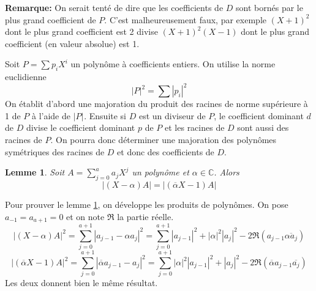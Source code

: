 \documentclass[a4paper,11pt]{book}
\newtheorem{lemma}[thm]{Lemme}
\begin{document}
\begin{giacjshere}
{\bf{Remarque:}} On serait tenté de dire que les coefficients de $D$
sont bornés par le plus grand coefficient de $P$. C'est malheureusement faux,
par exemple $( X + 1 )^2$ dont le plus grand coefficient est 2 divise $( X + 1
)^2 ( X - 1 )$ dont le plus grand coefficient (en valeur absolue) est 1.

Soit $P = \sum p_i X^i$ un polynôme à coefficients entiers. On utilise la
norme euclidienne
\begin{equation}
  | P |^2 = \sum | p_i |^2
\end{equation}
On établit d'abord une majoration du produit des racines de norme supérieure à
1 de $P$ à l'aide de $| P |^{}$. Ensuite si $D$ est un diviseur de $P$, le
coefficient dominant $d$ de $D$ divise le coefficient dominant $p$ de $P$ et 
les racines de $D$ sont aussi des racines de $P$. On pourra donc déterminer une
majoration des polynômes symétriques des racines de $D$ et donc des
coefficients de $D$.

\begin{lemma} \label{lemme:A}
  Soit $A = \sum_{j = 0}^a a_j X^j$ un polynôme et $\alpha \in \mathbb{C}$.
  Alors
  \[ | ( X - \alpha ) A | = | ( \overline{\alpha} X - 1 ) A | \]
\end{lemma}

Pour prouver le lemme \ref{lemme:A}, on développe les produits de polynômes. 
On pose $a_{-1} = a_{a + 1} = 0$ et on note $\Re$ la partie réelle.
\[ | ( X - \alpha ) A |^2 = \sum_{j = 0}^{a + 1} | a_{j - 1} - \alpha
   a_j |^2 = \sum_{j = 0}^{a + 1} | a_{j - 1} |^2 + | \alpha |^2 | a_j |^2 - 2
   \Re ( a_{j - 1} \overline{\alpha  a_j} ) \]
\[ | (  \overline{\alpha} X - 1 ) A |^2 = \sum_{j = 0}^{a + 1} | 
\overline{\alpha} a_{j - 1}
   - a_j |^2 = \sum_{j = 0}^{a + 1} | \alpha |^2 | a_{j - 1} |^2 + | a_j |^2 -
   2 \Re ( \overline{\alpha}  a_{j - 1}   \overline{a_j} ) \]
Les deux donnent bien le même résultat.


\end{giacjshere}
\end{document}
